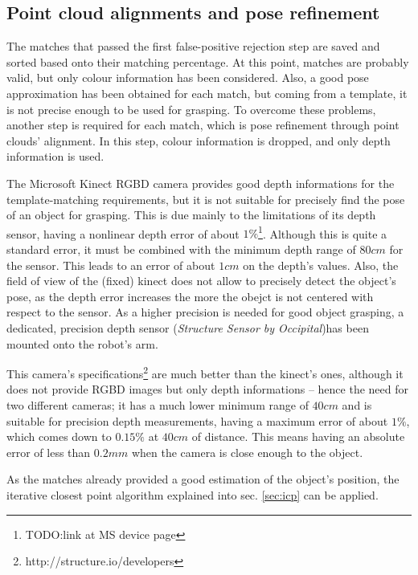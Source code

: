 \subsection{Point cloud alignments and pose refinement}
The matches that passed the first false-positive rejection step are saved and
sorted based onto their matching percentage. At this point, matches are probably
valid, but only colour information has been considered. Also, a good pose
approximation has been obtained for each match, but coming from a template, it
is not precise enough to be used for grasping. To overcome these problems,
another step is required for each match, which is pose refinement through point
clouds' alignment. In this step, colour information is dropped, and only depth
information is used. 

The Microsoft Kinect RGBD camera provides good depth informations for the template-matching
requirements, but it is not suitable for precisely find the pose of an object
for grasping. This is due mainly to the limitations of its depth sensor, having
a nonlinear depth error of about $1\%$\footnote{TODO:link at MS device page}.
Although this is quite a standard error, it must be combined with the minimum
depth range of $80\unit{cm}$ for the sensor. This leads to an error of about
$1\unit{cm}$ on the depth's values. Also, the field of view of the (fixed)
kinect does not allow to precisely detect the object's pose, as the depth error
increases the more the obejct is not centered with respect to the sensor. As a
higher precision is needed for good 
object grasping, a dedicated, precision depth sensor (\emph{Structure Sensor by
Occipital})has been mounted onto the robot's arm.


This camera's specifications\footnote{http://structure.io/developers} are much better than the kinect's ones, although it
does not provide RGBD images but only depth informations -- hence the need for two
different cameras; it has a much lower minimum range of $40\unit{cm}$ and is suitable for
precision depth measurements, having a maximum error of about $1\%$, which comes
down to $0.15\%$ at $40\unit{cm}$ of distance. This means having an absolute
error of less than $0.2\unit{mm}$ when the camera is close enough to the object.

As the matches already provided a good estimation of the object's position, the
iterative closest point algorithm explained into sec. \ref{sec:icp} can be
applied. 


